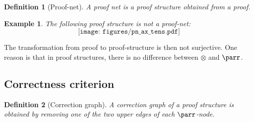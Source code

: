 \documentclass[a4paper,10pt]{article}
\newtheorem{definition}{Definition}
\newtheorem{ex}{Example}
\begin{document}
\begin{definition}[Proof-net]
	A proof net is a proof structure obtained from a proof.
\end{definition}
\begin{ex}
The following proof structure is not a proof-net:
		$$\texttt{[image: figures/pn\_ax\_tens.pdf]}$$
\end{ex}

The transformation from proof to proof-structure is then not surjective. One reason is that in proof structures, there is no difference between $\otimes$ and $\parr$.

\subsection{Correctness criterion}

\begin{definition}[Correction graph]
	A correction graph of a proof structure is obtained by removing one of the two upper edges of each $\parr$-node.
\end{definition}
\end{document}
